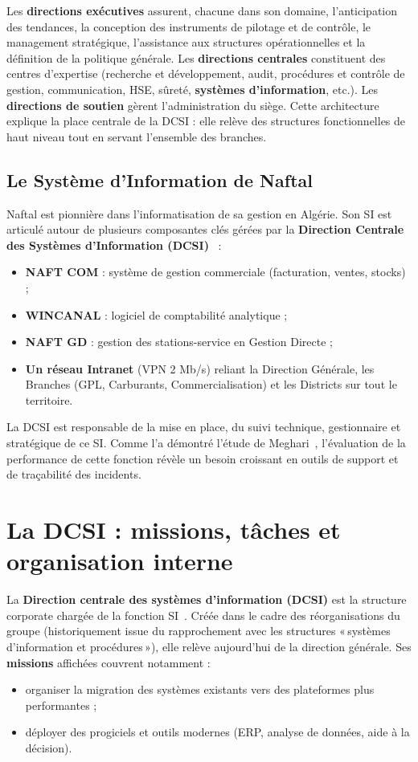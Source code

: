 Les \textbf{directions exécutives} assurent, chacune dans son domaine, l'anticipation des
tendances, la conception des instruments de pilotage et de contrôle, le management stratégique,
l'assistance aux structures opérationnelles et la définition de la politique générale. Les
\textbf{directions centrales} constituent des centres d'expertise (recherche et développement,
audit, procédures et contrôle de gestion, communication, HSE, sûreté, \textbf{systèmes
d'information}, etc.). Les \textbf{directions de soutien} gèrent l'administration du siège.
Cette architecture explique la place centrale de la DCSI : elle relève des structures fonctionnelles
de haut niveau tout en servant l'ensemble des branches.

\subsection{Le Système d'Information de Naftal}
Naftal est pionnière dans l'informatisation de sa gestion en Algérie. Son SI est
articulé autour de plusieurs composantes clés gérées par la
\textbf{Direction Centrale des Systèmes d'Information (DCSI)}~\cite{ssiouani2010} :
\begin{itemize}
    \item \textbf{NAFT COM} : système de gestion commerciale (facturation, ventes, stocks) ;
    \item \textbf{WINCANAL} : logiciel de comptabilité analytique ;
    \item \textbf{NAFT GD} : gestion des stations-service en Gestion Directe ;
    \item \textbf{Un réseau Intranet} (VPN 2 Mb/s) reliant la Direction Générale, les
    Branches (GPL, Carburants, Commercialisation) et les Districts sur tout le territoire.
\end{itemize}
La DCSI est responsable de la mise en place, du suivi technique, gestionnaire et
stratégique de ce SI. Comme l'a démontré l'étude de Meghari~\cite{meghari2014},
l'évaluation de la performance de cette fonction révèle un besoin croissant en outils
de support et de traçabilité des incidents.

\section{La DCSI : missions, tâches et organisation interne}
La \textbf{Direction centrale des systèmes d'information (DCSI)} est la structure corporate
chargée de la fonction SI~\cite{ssiouani2010,meghari2014}. Créée dans le cadre des
réorganisations du groupe (historiquement issue du rapprochement avec les structures «\,systèmes
d'information et procédures\,»), elle relève aujourd'hui de la direction générale. Ses
\textbf{missions} affichées couvrent notamment :
\begin{itemize}
    \item organiser la migration des systèmes existants vers des plateformes plus performantes ;
    \item déployer des progiciels et outils modernes (ERP, analyse de données, aide à la décision).
\end{itemize}

